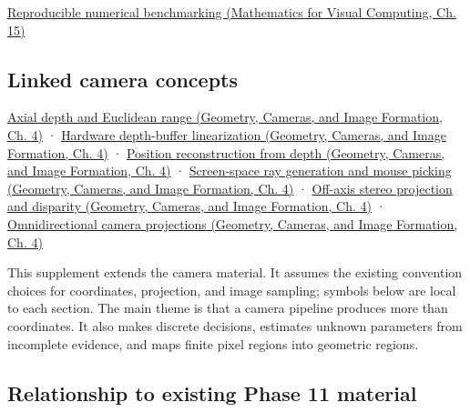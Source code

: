 \href{../02-Mathematics-for-Visual-Computing/main.pdf\#nameddest=02-foundations-ii-ch031-test-numerical-methods-and-benchmark-reproducibly}{Reproducible numerical benchmarking (Mathematics for Visual Computing, Ch. 15)}

\subsection{Linked camera concepts}\label{02-foundations-ii-ch039-linked-camera-concepts}

\href{../03-Geometry-Cameras-and-Image-Formation/main.pdf\#nameddest=02-foundations-ii-ch035-recover-geometry-from-depth-and-construct-screen-space-rays}{Axial depth and Euclidean range (Geometry, Cameras, and Image Formation, Ch. 4)} · \href{../03-Geometry-Cameras-and-Image-Formation/main.pdf\#nameddest=02-foundations-ii-ch035-recover-geometry-from-depth-and-construct-screen-space-rays}{Hardware depth-buffer linearization (Geometry, Cameras, and Image Formation, Ch. 4)} · \href{../03-Geometry-Cameras-and-Image-Formation/main.pdf\#nameddest=02-foundations-ii-ch035-recover-geometry-from-depth-and-construct-screen-space-rays}{Position reconstruction from depth (Geometry, Cameras, and Image Formation, Ch. 4)} · \href{../03-Geometry-Cameras-and-Image-Formation/main.pdf\#nameddest=02-foundations-ii-ch035-recover-geometry-from-depth-and-construct-screen-space-rays}{Screen-space ray generation and mouse picking (Geometry, Cameras, and Image Formation, Ch. 4)} · \href{../03-Geometry-Cameras-and-Image-Formation/main.pdf\#nameddest=02-foundations-ii-ch035-build-projection-and-stereo-geometry-around-real-camera-baselines}{Off-axis stereo projection and disparity (Geometry, Cameras, and Image Formation, Ch. 4)} · \href{../03-Geometry-Cameras-and-Image-Formation/main.pdf\#nameddest=02-foundations-ii-ch035-represent-directions-over-the-full-sphere}{Omnidirectional camera projections (Geometry, Cameras, and Image Formation, Ch. 4)}

This supplement extends the camera material. It assumes the existing convention choices for coordinates, projection, and image sampling; symbols below are local to each section. The main theme is that a camera pipeline produces more than coordinates. It also makes discrete decisions, estimates unknown parameters from incomplete evidence, and maps finite pixel regions into geometric regions.

\subsection{Relationship to existing Phase 11 material}\label{02-foundations-ii-ch039-relationship-to-existing-phase-11-material}

